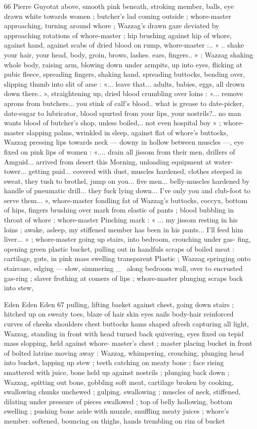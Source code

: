 66 Pierre Guyotat
above, smooth pink beneath, stroking member, balls, eye drawn
white towards women ; butcher's lad coming outside ; whore-master
approaching, turning around whore ; Wazzag's drawn gaze deviated
by approaching rotations of whore-master ; hip brushing against hip
of whore, against hand, against scabs of dried blood on rump,
whore-master :.. « .. shake your hair, your head, body, groin, brows,
lashes. ears, fingers.. » ; Wazzag shaking whole body, raising arm,
blowing down under armpits, up into eyes, flicking at pubic fleece,
spreading fingers, shaking hand, spreading buttocks, bending over,
slipping thumb into slit of arse : «... leave that... adults, babies, eggs,
all drown down there.. », straightening up, dried blood crumbling
over loins : «... remove aprons from butchers... you stink of calf’s
blood.. what is grease to date-picker, date-sugar to lubricator, blood
spurted from your lips, your nostrils?.. no man wants blood of
butcher's shop, unless boiled,.. not even hospital boy » ; whore-
master slapping palms, wrinkled in sleep, against flat of whore's
buttocks, Wazzag pressing lips towards neck — downy in hollow
between muscles —, eye fixed on pink lips of women : «.... drain all
jissom from their men, drillers of Amguid... arrived from desert this
Morning, unloading equipment at water-tower... getting paid...
covered with dust, muscles hardened, clothes steeped in sweat, they
tush to brothel, jump on you... five men... belly-muscles hardened by
handle of pneumatic drill... they fuck lying down... I've only you and
club-foot to serve them... », whore-master fondling fat of Wazzag's
buttocks, coccyx, bottom of hips, fingers brushing over mark from
elastic of pants ; blood bubbling in throat of whore ; whore-master
Pinching mark : « ... my jissom resting in his loins ; awake, asleep, my
stiffened member has been in his pants... I'll feed him liver... » ;
whore-master going up stairs, into bedroom, crouching under gas-
fing, opening green plastic bucket, pulling out in handfuls scraps of
boiled meat : cartilage, guts, in pink mass swelling transparent
Plastic ; Wazzag springing onto staircase, edging — slow, simmering
_~ along bedroom wall, over to encrusted gas-ring ; slaver frothing
at comers of lips ; whore-master plunging scraps back into stew,

Eden Eden Eden 67
pulling, lifting basket against chest, going down stairs ; hitched up
on sweaty toes, blaze of hair skin eyes nails body-hair reinforced
curves of cheeks shoulders chest buttocks hams shaped afresh
capturing all light, Wazzag, standing in front with head turned back
quivering, eyes fixed on tepid mass slopping, held against whore-
master’s chest ; master placing bucket in front of bolted latrine
moving away : Wazzag, whimpering, crouching, plunging head into
bucket, lapping up stew ; teeth catching on meaty bone ; face rising
smattered with juice, bone held up against nostrils ; plunging back
down ; Wazzag, spitting out bone, gobbling soft meat, cartilage
broken by cooking, swallowing chunks unchewed ; gulping.
swallowing ; muscles of neck, stiffened, dilating under pressure of
pieces swallowed ; top of belly hollowing, bottom swelling ; pushing
bone aside with muzzle, snuffling meaty juices ; whore’s member.
softened, bouncing on thighs, hands trembling on rim of bucket

